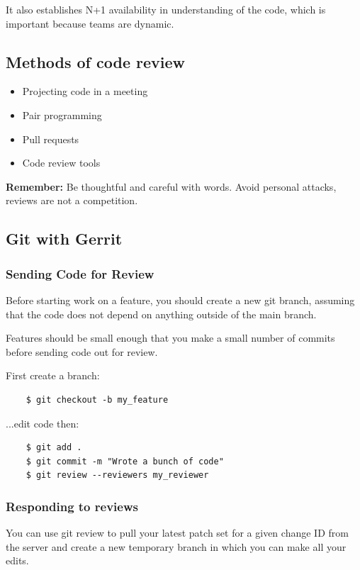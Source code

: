 \documentclass{article}
\begin{document}
It also establishes N+1 availability in understanding of the code, which is important because teams are dynamic.

\subsection{Methods of code review}
\begin{itemize}
    \item Projecting code in a meeting
    \item Pair programming
    \item Pull requests
    \item Code review tools
\end{itemize}

\textbf{Remember:} Be thoughtful and careful with words. Avoid personal attacks, reviews are not a competition.

\subsection{Git with Gerrit}

\subsubsection*{Sending Code for Review}

Before starting work on a feature, you should create a new git branch, assuming that the code does not depend on anything outside of the main branch. 

Features should be small enough that you make a small number of commits before sending code out for review.

First create a branch:
\begin{verbatim}
    $ git checkout -b my_feature 
\end{verbatim}

...edit code then:
\begin{verbatim}
    $ git add .
    $ git commit -m "Wrote a bunch of code"
    $ git review --reviewers my_reviewer
\end{verbatim}

\subsubsection*{Responding to reviews }

You can use git review to pull your latest patch set for a given change ID from the server and create a new temporary branch in which you can make all your edits. 
\end{document}
